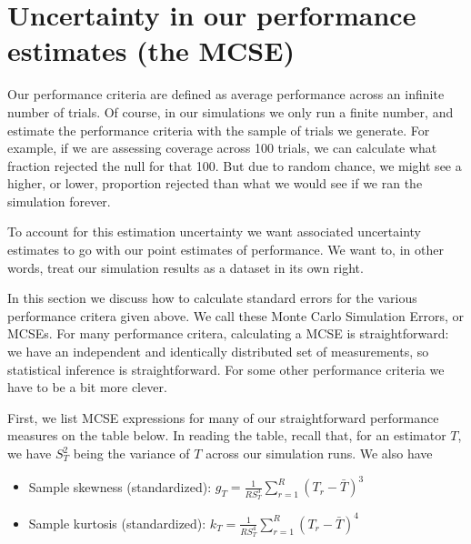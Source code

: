 \documentclass[
]{book}
\providecommand{\tightlist}{%
  \setlength{\itemsep}{0pt}\setlength{\parskip}{0pt}}
\begin{document}
\hypertarget{uncertainty-in-our-performance-estimates-the-mcse}{%
\section{Uncertainty in our performance estimates (the MCSE)}\label{uncertainty-in-our-performance-estimates-the-mcse}}

Our performance criteria are defined as average performance across an infinite number of trials.
Of course, in our simulations we only run a finite number, and estimate the performance criteria with the sample of trials we generate.
For example, if we are assessing coverage across 100 trials, we can calculate what fraction rejected the null for that 100.
But due to random chance, we might see a higher, or lower, proportion rejected than what we would see if we ran the simulation forever.

To account for this estimation uncertainty we want associated uncertainty estimates to go with our point estimates of performance.
We want to, in other words, treat our simulation results as a dataset in its own right.

In this section we discuss how to calculate standard errors for the various performance critera given above.
We call these Monte Carlo Simulation Errors, or MCSEs.
For many performance critera, calculating a MCSE is straightforward: we have an independent and identically distributed set of measurements, so statistical inference is straightforward.
For some other performance criteria we have to be a bit more clever.

First, we list MCSE expressions for many of our straightforward performance measures on the table below.
In reading the table, recall that, for an estimator \(T\), we have \(S_T^2\) being the variance of \(T\) across our simulation runs.
We also have

\begin{itemize}
\tightlist
\item
  Sample skewness (standardized): \(\displaystyle{g_T = \frac{1}{R S_T^3}\sum_{r=1}^R \left(T_r - \bar{T}\right)^3}\)
\item
  Sample kurtosis (standardized): \(\displaystyle{k_T = \frac{1}{R S_T^4} \sum_{r=1}^R \left(T_r - \bar{T}\right)^4}\)
\end{itemize}
\end{document}

